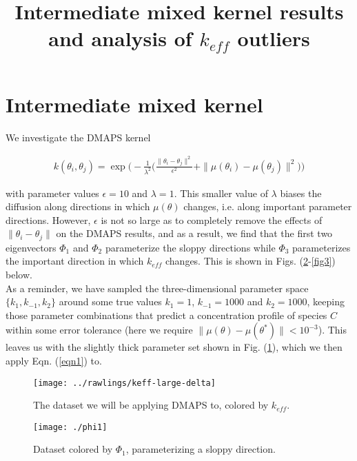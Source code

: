\documentclass[11pt]{article}
\title{Intermediate mixed kernel results and analysis of
  $k_{eff}$ outliers}
\begin{document}
\maketitle

\section{Intermediate mixed kernel}

We investigate the DMAPS kernel

\begin{align}
  k(\theta_i, \theta_j) = \exp \bigg( -\frac{1}{\lambda^2} \bigg( \frac{\|\theta_i
  - \theta_j\|^2}{\epsilon^2} + \|\mu(\theta_i) -
  \mu(\theta_j)\|^2\bigg) \bigg)
  \label{eqn1}
\end{align}

with parameter values $\epsilon = 10$ and $\lambda = 1$. This smaller
value of $\lambda$ biases the diffusion along directions in which
$\mu(\theta)$ changes, i.e. along important parameter
directions. However, $\epsilon$ is not so large as to completely
remove the effects of $\| \theta_i - \theta_j \|$ on the DMAPS
results, and as a result, we find that the first two eigenvectors
$\Phi_1$ and $\Phi_2$ parameterize the sloppy directions while
$\Phi_3$ parameterizes the important direction in which $k_{eff}$
changes. This is shown in Figs. (\ref{fig1}-\ref{fig3}) below. \\

As a reminder, we have sampled the three-dimensional parameter space
$\{k_1, k_{-1}, k_2 \}$ around some true values $k_1 = 1$,
$k_{-1} = 1000$ and $k_2 = 1000$, keeping those parameter combinations that
predict a concentration profile of species $C$ within some error
tolerance (here we require $\| \mu(\theta) - \mu(\theta^*) \| <
10^{-3}$). This leaves us with the slightly thick parameter set shown
in Fig. (\ref{fig0}), which we then apply Eqn. (\ref{eqn1}) to.

\begin{figure}[htbp]
  \centering
  \texttt{[image: ../rawlings/keff-large-delta]}
  \caption{The dataset we will be applying DMAPS to, colored by
    $k_{eff}$. \label{fig0}}
\end{figure}

\begin{figure}[htbp]
  \centering
  \texttt{[image: ./phi1]}
  \caption{Dataset colored by $\Phi_1$, parameterizing a sloppy
    direction. \label{fig1}}
\end{figure}
\end{document}
